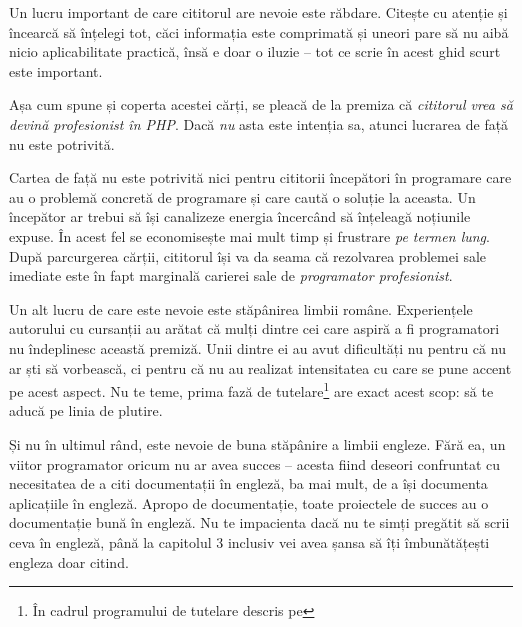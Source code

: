 Un lucru important de care cititorul are nevoie este răbdare. Citește cu
atenție și încearcă să înțelegi tot, căci informația este comprimată și uneori
pare să nu aibă nicio aplicabilitate practică, însă e doar o iluzie -- tot ce
scrie în acest ghid scurt este important.


Așa cum spune și coperta acestei cărți, se pleacă de la premiza că
\textit{cititorul vrea să devină profesionist în PHP}. Dacă \textit{nu} asta
este intenția sa, atunci lucrarea de față nu este potrivită.

Cartea de față nu este potrivită nici pentru cititorii începători în programare
care au o problemă concretă de programare și care caută o soluție la aceasta.
Un începător ar trebui să își canalizeze energia încercând să înțeleagă
noțiunile expuse. În acest fel se economisește mai mult timp și frustrare
\textit{pe termen lung}. După parcurgerea cărții, cititorul își va da seama că
rezolvarea problemei sale imediate este în fapt marginală carierei sale de
\textit{programator profesionist}.


Un alt lucru de care este nevoie este stăpânirea limbii române. Experiențele
autorului cu cursanții au arătat că mulți dintre cei care aspiră a fi
programatori nu îndeplinesc această premiză. Unii dintre ei au avut dificultăți
nu pentru că nu ar ști să vorbească, ci pentru că nu au realizat intensitatea
cu care se pune accent pe acest aspect.
Nu te teme, prima fază de tutelare\footnote{În cadrul programului de tutelare descris pe \phpro} are
exact acest scop: să te aducă pe linia de plutire.

Și nu în ultimul rând, este nevoie de buna stăpânire a limbii engleze.
Fără ea, un viitor programator oricum nu ar avea succes -- acesta fiind deseori
confruntat cu necesitatea de a citi documentații în engleză, ba mai mult, de a își documenta
aplicațiile în engleză. Apropo de documentație, toate proiectele de succes au
o documentație bună în engleză. Nu te impacienta dacă nu te simți pregătit să
scrii ceva în engleză, până la capitolul 3 inclusiv vei avea șansa să îți
îmbunătățești engleza doar citind.

